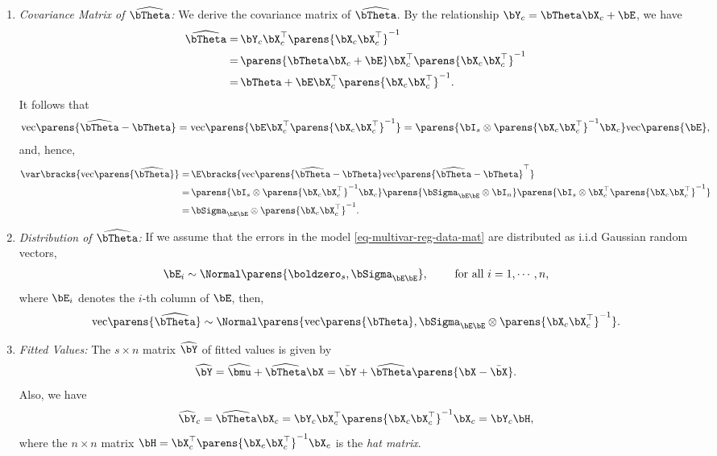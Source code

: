 \documentclass[12pt]{article}
\begin{document}
\begin{enumerate}[label=\textbf{\arabic*.}]
\begin{enumerate}
		\item \textit{Covariance Matrix of $\widehat{\bTheta}$:} We derive the covariance matrix of $\widehat{\bTheta}$. By the relationship $\bY_c = \bTheta \bX_c + \bE$, we have 
		\begin{align*}
			\widehat{\bTheta} = & \, \bY_c \bX_c^{\top} \parens{\bX_c \bX_c^\top }^{-1} \\ 
			= & \, \parens{\bTheta \bX_c + \bE} \bX_c^{\top} \parens{\bX_c \bX_c^\top }^{-1} \\ 
			= & \, \bTheta + \bE \bX_c^{\top} \parens{\bX_c \bX_c^\top }^{-1}. 
		\end{align*}
		It follows that 
		\begin{align*}
			\mathrm{vec} \parens{\widehat{\bTheta} - \bTheta} = \mathrm{vec} \parens{\bE \bX_c^{\top} \parens{\bX_c \bX_c^\top }^{-1}} = \parens{\bI_s \otimes \parens{\bX_c \bX_c^\top}^{-1} \bX_c} \mathrm{vec} \parens{\bE}, 
		\end{align*}
		and, hence, 
		\begin{align*}
			\var \bracks{\mathrm{vec} \parens{\widehat{\bTheta}}} = & \, \E \bracks{\mathrm{vec} \parens{\widehat{\bTheta} - \bTheta} \mathrm{vec} \parens{\widehat{\bTheta} - \bTheta}^\top} \nonumber \\ 
			= & \, \parens{\bI_s \otimes \parens{\bX_c \bX_c^\top }^{-1} \bX_c} \parens{\bSigma_{\bE \bE} \otimes \bI_n} \parens{\bI_s \otimes \bX_c^{\top} \parens{\bX_c \bX_c^{\top}}^{-1}} \nonumber \\ 
			= & \, \bSigma_{\bE \bE} \otimes \parens{\bX_c \bX_c^{\top}}^{-1}. 
		\end{align*}
		
		\item \textit{Distribution of $\widehat{\bTheta}$:} If we assume that the errors in the model \eqref{eq-multivar-reg-data-mat} are distributed as i.i.d Gaussian random vectors, 
		\begin{align*}
			\bE_i \sim \Normal \parens{\boldzero_s, \bSigma_{\bE \bE}}, \qquad \text{ for all } i = 1, \cdots, n, 
		\end{align*}
		where $\bE_i$ denotes the $i$-th column of $\bE$, then, 
		\begin{align*}
			\mathrm{vec} \parens{\widehat{\bTheta}} \sim \Normal \parens{ \mathrm{vec} \parens{\bTheta}, \bSigma_{\bE \bE} \otimes \parens{\bX_c \bX_c^{\top}}^{-1}}. 
		\end{align*}
		
		\item \textit{Fitted Values:} The $s \times n$ matrix $\widehat{\bY}$  of fitted values is given by 
		\begin{align*}
			\widehat{\bY} = \widehat{\bmu} + \widehat{\bTheta} \bX = \bar{\bY} + \widehat{\bTheta} \parens{\bX - \bar{\bX}}. 
		\end{align*}
		Also, we have 
		\begin{align*}
			\widehat{\bY}_c = \widehat{\bTheta} \bX_c = \bY_c \bX_c^\top \parens{\bX_c \bX_c^{\top}}^{-1} \bX_c = \bY_c \bH, 
		\end{align*}
		where the $n \times n$ matrix $\bH = \bX_c^\top \parens{\bX_c \bX_c^{\top}}^{-1} \bX_c$ is the \emph{hat matrix}. 		
		

\end{enumerate}
\end{enumerate}
\end{document}
